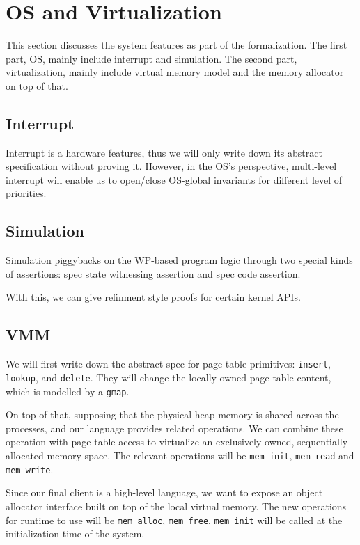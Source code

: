 \section{OS and Virtualization}
\label{sec:osvirt}

This section discusses the system features as part of the formalization.
The first part, OS, mainly include interrupt and simulation.
The second part, virtualization, mainly include virtual memory model and
the memory allocator on top of that.

\subsection{Interrupt}

Interrupt is a hardware features, thus we will only write down its abstract specification
without proving it. However, in the OS's perspective, multi-level interrupt will enable us to
open/close OS-global invariants for different level of priorities.

\subsection{Simulation}

Simulation piggybacks on the WP-based program logic through two special kinds of assertions:
spec state witnessing assertion and spec code assertion.

With this, we can give refinment style proofs for certain kernel APIs.

\subsection{VMM}

We will first write down the abstract spec for page table primitives:
\texttt{insert}, \texttt{lookup}, and \texttt{delete}. They will change the
locally owned page table content, which is modelled by a \texttt{gmap}.

On top of that, supposing that the physical heap memory is shared across the processes,
and our language provides related operations. We can combine these operation with
page table access to virtualize an exclusively owned, sequentially allocated memory space.
The relevant operations will be \texttt{mem\_init}, \texttt{mem\_read} and \texttt{mem\_write}.

Since our final client is a high-level language, we want to expose an object allocator interface
built on top of the local virtual memory. The new operations for runtime to use will be
\texttt{mem\_alloc}, \texttt{mem\_free}.
\texttt{mem\_init} will be called at the initialization time of the system.
